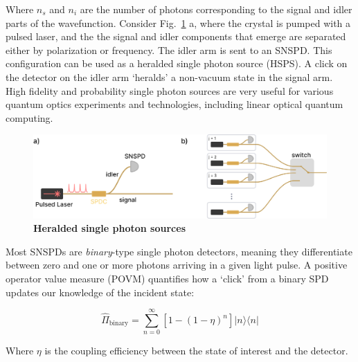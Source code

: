 \documentclass[11pt]{caltech_thesis} %
\begin{document}
Where $n_s$ and $n_i$ are the number of photons corresponding to the signal and idler parts of the wavefunction. Consider Fig.~\ref{fig:hsps} a, where the crystal is pumped with a pulsed laser, and the the signal and idler components that emerge are separated either by polarization or frequency. The idler arm is sent to an SNSPD. This configuration can be used as a heralded single photon source (HSPS). A click on the detector on the idler arm `heralds' a non-vacuum state in the signal arm. High fidelity and probability single photon sources are very useful for various quantum optics experiments and technologies, including linear optical quantum computing.

\hypertarget{fig:hsps}{%
\begin{figure}
\centering
\includegraphics{./chapter_07/figs/hsps_light.pdf}
\caption[{Heralded single photon source designs}]{\textbf{Heralded single photon sources}}
\label{fig:hsps}
\end{figure}
}

Most SNSPDs are \emph{binary}-type single photon detectors, meaning they differentiate between zero and one or more photons arriving in a given light pulse. A positive operator value measure (POVM) quantifies how a `click' from a binary SPD updates our knowledge of the incident state:

$$\hat{\Pi}_{\text {binary}} = \sum_{n=0}^{\infty}\left[1-(1-\eta)^{n}\right]|n\rangle\langle n|$$

Where $\eta$ is the coupling efficiency between the state of interest and the detector.
\end{document}
